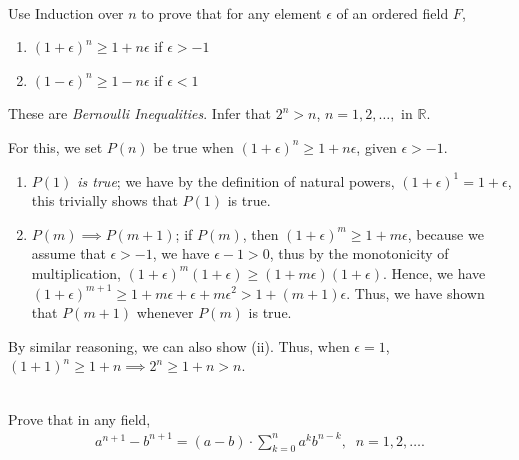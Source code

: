 \documentclass[12pt]{book}
\newcommand{\e}{\epsilon}
\theoremstyle{definition}
\begin{document}
\begin{ex}[8]
\\
Use Induction over $n$ to prove that for any element $\e$ of an ordered field $F$, 
\begin{enumerate}[label=(\roman*)]
	\item $(1+\e)^n \geq 1 +n\e$ if $\e >-1$
	\item $(1-\e)^n \geq 1 -n\e $ if $\e <1$ 
\end{enumerate}
These are \textit{Bernoulli Inequalities}. Infer that $2^n >n$, $n=1,2,\ldots,$ in $\mathbb{R}$.	
\end{ex}
\begin{sol}
For this, we set $P(n)$ be true when $(1+\e)^n \geq 1 +n\e$, given $\e >-1$.
\begin{enumerate}[label=(\roman*)]
	\item \textit{$P(1)$ is true}; we have by the definition of natural powers, $(1+\e)^1=1+\e$, this trivially shows that $P(1)$ is true.
	\item $P(m)\implies P(m+1)$; if $P(m)$, then $(1+\e)^m \geq 1 +m\e$, because we assume that $\e >-1$, we have $\e-1>0$, thus by the monotonicity of multiplication, $(1+\e)^m(1+\e)  \geq (1+m\e)(1+\e)$. Hence, we have $(1+\e)^{m+1} \geq 1+m\e +\e +m\e^2 > 1+(m+1)\e$. Thus, we have shown that $P(m+1)$ whenever $P(m)$ is true. 
\end{enumerate}
By similar reasoning, we can also show (ii). Thus, when $\e =1$, $(1+1)^n \geq 1+n \implies 2^n\geq 1+n>n$.
\end{sol}
\begin{ex}[9]
\\
Prove that in any field,
\begin{align*}
	a^{n+1}-b^{n+1}= (a-b)\cdot \sum_{k=0}^n a^kb^{n-k}, \;\; n=1,2, \ldots .
\end{align*}	
\end{ex}
\end{document}
